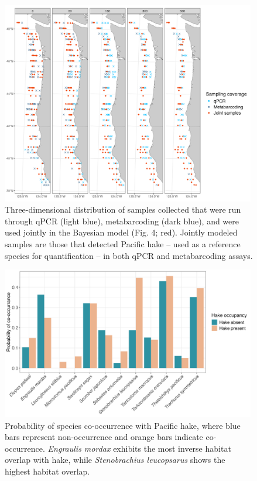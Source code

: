 \documentclass{article}
\begin{document}
\begin{figure}
\centering
\includegraphics[width=0.99\textwidth]{plots/7_Supplementary_Figure_3.jpg}
\caption{Three-dimensional distribution of samples collected that were run through qPCR (light blue), metabarcoding (dark blue), and were used jointly in the Bayesian model (Fig. 4; red). Jointly modeled samples are those that detected Pacific hake -- used as a reference species for quantification -- in both qPCR and metabarcoding assays.}
\end{figure}

\begin{figure}
\centering
\includegraphics[width=0.99\textwidth]{plots/8_Supplementary_Figure_4.jpg}
\caption{Probability of species co-occurrence with Pacific hake, where blue bars represent non-occurrence and orange bars indicate co-occurrence. \textit{Engraulis mordax} exhibits the most inverse habitat overlap with hake, while \textit{Stenobrachius leucopsarus} shows the highest habitat overlap.}
\end{figure}
\end{document}
